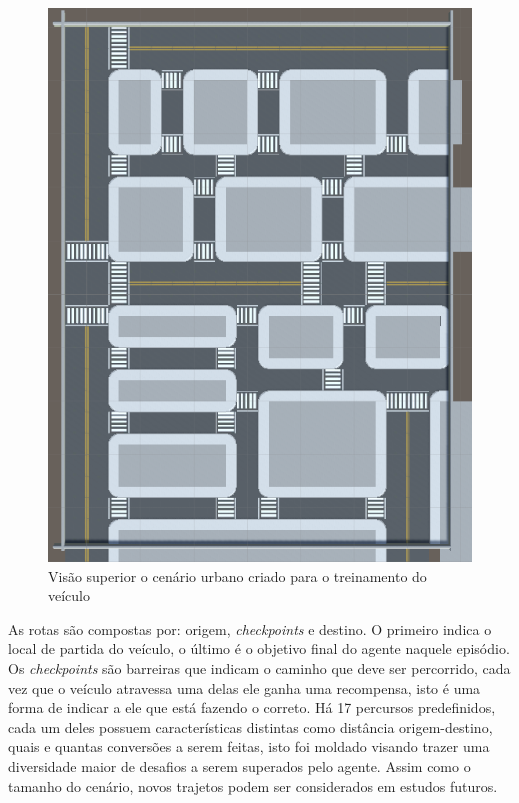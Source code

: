 \begin{figure}[h]
   \centering
   \includegraphics[scale=0.45, angle=90]{figs/Mapa-simulador-visao-superior.png}
    \caption{Visão superior o cenário urbano criado para o treinamento do veículo}
    \label{fig:map-view}
 \end{figure}

As rotas são compostas por: origem, \textit{checkpoints} e destino. O primeiro indica o local de partida do veículo, o último é o objetivo final do agente naquele episódio. Os \textit{checkpoints} são barreiras que indicam o caminho que deve ser percorrido, cada vez que o veículo atravessa uma delas ele ganha uma recompensa, isto é uma forma de indicar a ele que está fazendo o correto. Há 17 percursos predefinidos, cada um deles possuem características distintas como distância origem-destino, quais e quantas conversões a serem feitas, isto foi moldado visando trazer uma diversidade maior de desafios a serem superados pelo agente. Assim como o tamanho do cenário, novos trajetos podem ser considerados em estudos futuros.


